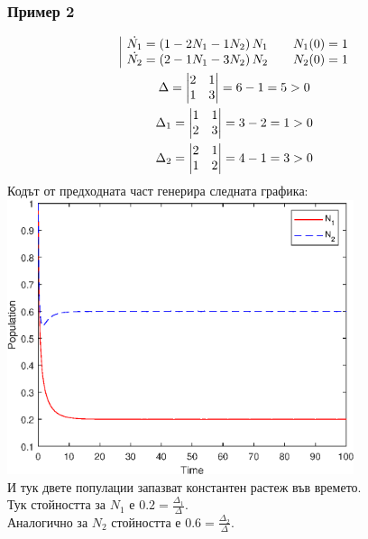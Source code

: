 \documentclass[a4paper,fleqn,12pt]{article}
\begin{document}
\subsubsection*{Пример 2}
\begin{gather*}
	\begin{array}{|l@{}}
	\dot{N_1} = \left(1 - 2N_1 - 1 N_2 \right) N_1 \qquad N_1(0) = 1\\
	\dot{N_2} = \left(2 - 1N_1 - 3 N_2 \right) N_2  \qquad N_2(0) = 1
	\end{array} \\
	\Delta = \begin{vmatrix} 2 & 1 \\ 1 & 3 \end{vmatrix} = 6 - 1 = 5 > 0 \\
	\Delta_1 = \begin{vmatrix}1 & 1 \\ 2 & 3 \end{vmatrix} = 3 - 2 = 1 > 0 \\
	\Delta_2 = \begin{vmatrix}2 & 1\\ 1 & 2 \end{vmatrix} = 4-1 = 3 > 0
\end{gather*}
Кодът от предходната част генерира следната графика: \\
\includegraphics [width=4in]{ecologyComp_02.eps}\\
И тук двете популации запазват константен растеж във времето. \\
Тук стойността за $N_1$ е $0.2 = \frac{\Delta_1}{\Delta}$. \\
Аналогично за $N_2$ стойността е $0.6 = \frac{\Delta_2}{\Delta}$. \\
\newpage
\end{document}
